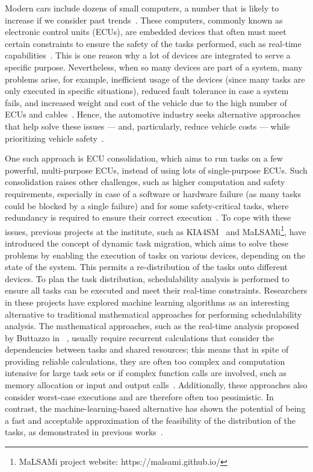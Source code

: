 Modern cars include dozens of small computers, a number that is likely to increase if we consider past trends~\parencite{vipin1, vipin2}. These computers, commonly known as electronic control units (ECUs), are embedded devices that often must meet certain constraints to ensure the safety of the tasks performed, such as real-time capabilities~\parencite{vipin1}. This is one reason why a lot of devices are integrated to serve a specific purpose. Nevertheless, when so many devices are part of a system, many problems arise, for example, inefficient usage of the devices (since many tasks are only executed in specific situations), reduced fault tolerance in case a system fails, and increased weight and cost of the vehicle due to the high number of ECUs and cables~\parencite{vipin2}. Hence, the automotive industry seeks alternative approaches that help solve these issues --- and, particularly, reduce vehicle costs --- while prioritizing vehicle safety~\parencite{mckinsey1}.
 
One such approach is ECU consolidation, which aims to run tasks on a few powerful, multi-purpose ECUs, instead of using lots of single-purpose ECUs. Such consolidation raises other challenges, such as higher computation and safety requirements, especially in case of a software or hardware failure (as many tasks could be blocked by a single failure) and for some safety-critical tasks, where redundancy is required to ensure their correct execution~\parencite{mundhenk1}. To cope with these issues, previous projects at the institute, such as KIA4SM~\parencite{kia1} and MaLSAMi\footnote{MaLSAMi project website: https://malsami.github.io/}, have introduced the concept of dynamic task migration, which aims to solve these problems by enabling the execution of tasks on various devices, depending on the state of the system. This permits a re-distribution of the tasks onto different devices. To plan the task distribution, schedulability analysis is performed to ensure all tasks can be executed and meet their real-time constraints. Researchers in these projects have explored machine learning algorithms as an interesting alternative to traditional mathematical approaches for performing schedulability analysis. The mathematical approaches, such as the real-time analysis proposed by Buttazzo in ~\parencite{buttazzo1}, usually require recurrent calculations that consider the dependencies between tasks and shared resources; this means that in spite of providing reliable calculations, they are often too complex and computation intensive for large task sets or if complex function calls are involved, such as memory allocation or input and output calls~\parencite{utz1,navet1}. Additionally, these approaches also consider worst-case executions and are therefore often too pessimistic. In contrast, the machine-learning-based alternative has shown the potential of being a fast and acceptable approximation of the feasibility of the distribution of the tasks, as demonstrated in previous works~\parencite{taieb1, utz1, blieninger1}. 


